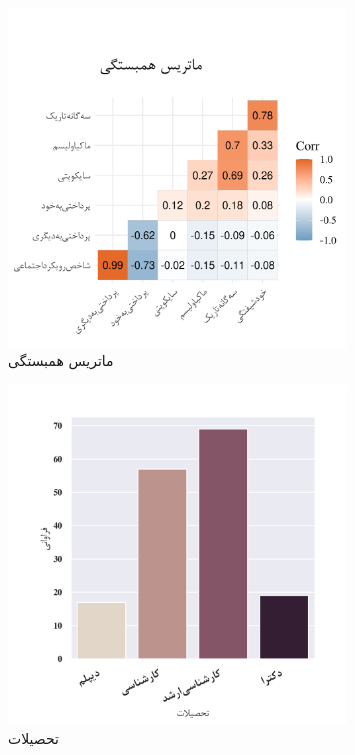 \LatexFromStatisticsRankMeansCommand
% 
\begin{figure}[htpb]
    \centering
    \includegraphics[width=0.8\textwidth]{./img/CorrPlotIntervals.png}
    \caption{ماتریس همبستگی}
    \label{fig:CorrPlotIntervals}
\end{figure}
\begin{figure}[htpb]
    \centering
    \includegraphics[width=0.8\textwidth]{./img/ordinal/EducationQuestion.png}
    \caption{تحصیلات}
    \label{fig:EducationQuestion}
\end{figure}
